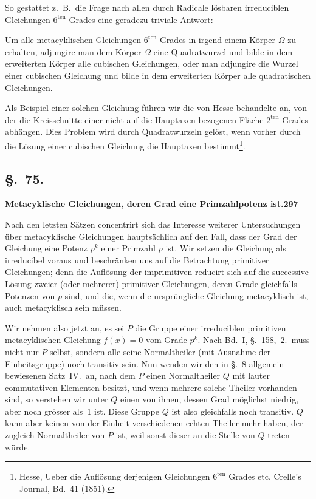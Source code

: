 \documentclass[12pt,a4paper]{article}
\begin{document}
So gestattet z.~B.\ die Frage nach allen durch Radicale l\"osbaren irreduciblen Gleichungen $6^{\text{ten}}$ Grades eine geradezu triviale Antwort:

Um alle metacyklischen Gleichungen $6^{\text{ten}}$ Grades in irgend einem K\"orper $\Omega$ zu erhalten, adjungire man dem K\"orper $\Omega$ eine Quadratwurzel und bilde in dem erweiterten K\"orper alle cubischen Gleichungen, oder man adjungire die Wurzel einer cubischen Gleichung und bilde in dem erweiterten K\"orper alle quadratischen Gleichungen.

Als Beispiel einer solchen Gleichung f\"uhren wir die von Hesse behandelte an, von der die Kreisschnitte einer nicht auf die Hauptaxen bezogenen Fl\"ache $2^{\text{ten}}$ Grades abh\"angen. Dies Problem wird durch Quadratwurzeln gel\"ost, wenn vorher durch die L\"osung einer cubischen Gleichung die Hauptaxen bestimmt\footnote{Hesse, Ueber die Aufl\"osung derjenigen Gleichungen $6^{\text{ten}}$ Grades etc. Crelle's Journal, Bd.~41 (1851).}.

\subsection*{\S.~75.}
\textbf{Metacyklische Gleichungen, deren Grad eine Primzahlpotenz ist.}\hfill\textbf{297}\\[4pt]

Nach den letzten S\"atzen concentrirt sich das Interesse weiterer Untersuchungen \"uber metacyklische Gleichungen haupts\"achlich auf den Fall, dass der Grad der Gleichung eine Potenz $p^k$ einer Primzahl $p$ ist. Wir setzen die Gleichung als irreducibel voraus und beschr\"anken uns auf die Betrachtung primitiver Gleichungen; denn die Aufl\"osung der imprimitiven reducirt sich auf die successive L\"osung zweier (oder mehrerer) primitiver Gleichungen, deren Grade gleichfalls Potenzen von $p$ sind, und die, wenn die urspr\"ungliche Gleichung metacyklisch ist, auch metacyklisch sein m\"ussen.

Wir nehmen also jetzt an, es sei $P$ die Gruppe einer irreduciblen primitiven metacyklischen Gleichung $f(x)=0$ vom Grade $p^k$. Nach Bd.~I, \S.~158,~2.\ muss nicht nur $P$ selbst, sondern alle seine Normaltheiler (mit Ausnahme der Einheitsgruppe) noch transitiv sein. Nun wenden wir den in \S.~8 allgemein bewiesenen Satz~IV.\ an, nach dem $P$ einen Normaltheiler $Q$ mit lauter commutativen Elementen besitzt, und wenn mehrere solche Theiler vorhanden sind, so verstehen wir unter $Q$ einen von ihnen, dessen Grad m\"oglichst niedrig, aber noch gr\"osser als~1 ist. Diese Gruppe $Q$ ist also gleichfalls noch transitiv. $Q$ kann aber keinen von der Einheit verschiedenen echten Theiler mehr haben, der zugleich Normaltheiler von $P$ ist, weil sonst dieser an die Stelle von $Q$ treten w\"urde.
\end{document}
